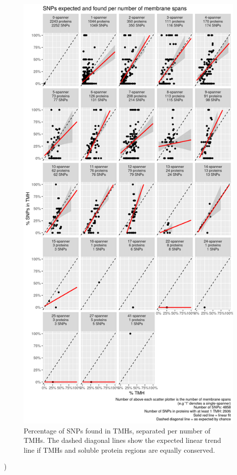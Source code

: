 \begin{figure}[!htbp]
  \includegraphics[width=\textwidth]{ncbi_peregrine_results/fig_f_snps_found_and_expected_per_n_tmhs.png}
  \caption{
    Percentage of SNPs found in TMHs,
    separated per number of TMHs.
    The dashed diagonal lines show the expected linear trend line
    if TMHs and soluble protein regions are equally conserved.
  }
  \label{fig:f_snps_found_and_expected_per_n_tmhs}
\end{figure}
)

